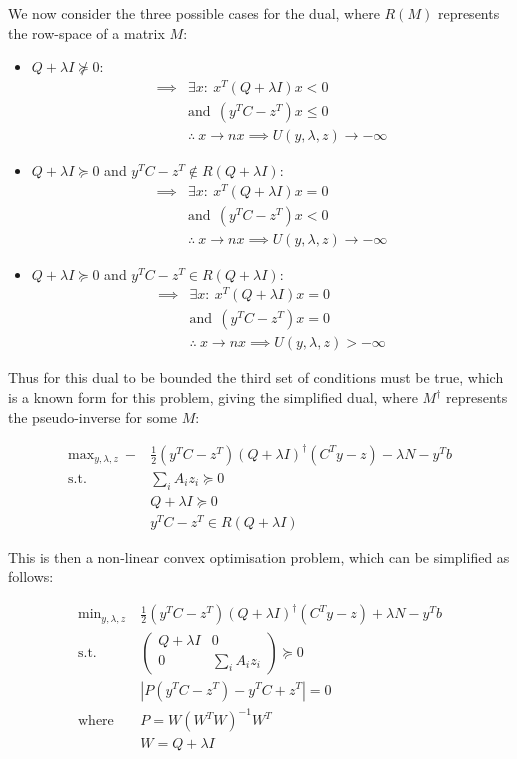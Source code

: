 \documentclass{article}
\begin{document}
We now consider the three possible cases for the dual, where $R(M)$ represents the row-space of a matrix $M$:

\begin{itemize}
\item $Q+\lambda I \not\succeq 0$:
	\begin{align}
		\implies &\exists x : ~ x^T (Q + \lambda I) x < 0 \\
				 &\text{and} ~~ (y^TC-z^T)x \le 0 \\
		&\therefore ~ x \to n x \implies U(y, \lambda, z) \to -\infty
	\end{align}
\item $Q+\lambda I \succeq 0$ and $y^TC-z^T \not \in R(Q+\lambda I)$:
	\begin{align}
		\implies &\exists x : ~ x^T (Q + \lambda I) x = 0 \\
				 &\text{and} ~~ (y^TC-z^T)x < 0 \\
		&\therefore ~ x \to n x \implies U(y, \lambda, z) \to -\infty
	\end{align}
\item $Q+\lambda I \succeq 0$ and $y^TC-z^T \in R(Q+\lambda I)$:
	\begin{align}
		\implies &\exists x : ~ x^T (Q + \lambda I) x = 0 \\
				 &\text{and} ~~ (y^TC-z^T)x = 0 \\
				 &\therefore ~ x \to n x \implies U(y, \lambda, z) > -\infty
	\end{align}
\end{itemize}

Thus for this dual to be bounded the third set of conditions must be true, which is a known form for this problem, giving the simplified dual, where $M^\dagger$ represents the pseudo-inverse for some $M$:

\begin{align}
	\text{max}_{y, \lambda, z} ~ -&\frac{1}{2} (y^T C - z^T) (Q+\lambda I)^\dagger (C^Ty - z) - \lambda N - y^T b \\ 
	\text{s.t.} ~~ &\sum_i A_i z_i \succeq 0 \\
				&Q+ \lambda I \succeq 0 \\
				&y^TC-z^T \in R(Q+\lambda I)
\end{align}

\pagebreak 

This is then a non-linear convex optimisation problem, which can be simplified as follows:

\begin{align}
	\text{min}_{y, \lambda, z} ~ &\frac{1}{2} (y^T C - z^T) (Q+\lambda I)^\dagger (C^Ty - z) + \lambda N - y^T b \\ 
	\text{s.t.} ~~ &\begin{pmatrix} Q+ \lambda I & 0 \\ 0 & \sum_i A_i z_i \end{pmatrix} \succeq 0 \\
			    &|P(y^TC-z^T)-y^T C+z^T| = 0 \\ 
				\text{where} ~~ &P = W (W^T W)^{-1} W^T \\
								&W = Q+\lambda I
\end{align}
\end{document}
